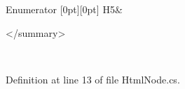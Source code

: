 \begin{DoxyEnumFields}{Enumerator}
[0pt][0pt]{}\mbox{\label{namespace_n_t_k_1_1_i_o_1_1_html_a871eb4a91323a2ea84afdabe1ac01ce3a830652084dda69b6b957e2c3a7bd9b18}} 
H5&\begin{DoxyVerb}    </summary> \end{DoxyVerb}
 \\
\hline

\end{DoxyEnumFields}


Definition at line 13 of file Html\+Node.\+cs.

